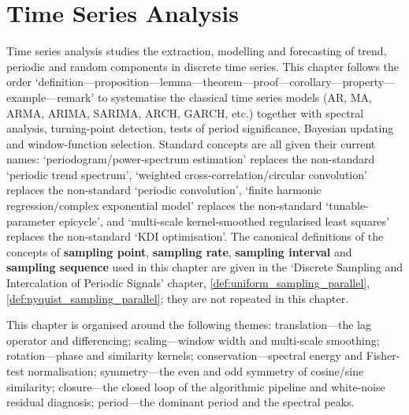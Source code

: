 \chapter{Time Series Analysis}
\label{chap:ts_analysis}

\begin{remark}\label{rem:ts_chapter_positioning}
Time series analysis studies the extraction, modelling and forecasting of trend, periodic and random components in discrete time series. This chapter follows the order `definition---proposition---lemma---theorem---proof---corollary---property---example---remark' to systematise the classical time series models (AR, MA, ARMA, ARIMA, SARIMA, ARCH, GARCH, etc.) together with spectral analysis, turning-point detection, tests of period significance, Bayesian updating and window-function selection. Standard concepts are all given their current names: `periodogram/power-spectrum estimation' replaces the non-standard `periodic trend spectrum', `weighted cross-correlation/circular convolution' replaces the non-standard `periodic convolution', `finite harmonic regression/complex exponential model' replaces the non-standard `tunable-parameter epicycle', and `multi-scale kernel-smoothed regularised least squares' replaces the non-standard `KDI optimisation'. The canonical definitions of the concepts of \textbf{sampling point}, \textbf{sampling rate}, \textbf{sampling interval} and \textbf{sampling sequence} used in this chapter are given in the `Discrete Sampling and Intercalation of Periodic Signals' chapter, \cref{def:uniform_sampling_parallel}, \cref{def:nyquist_sampling_parallel}; they are not repeated in this chapter.
\end{remark}

\begin{remark}\label{rem:ts_theme_overview}
This chapter is organised around the following themes: translation---the lag operator and differencing; scaling---window width and multi-scale smoothing; rotation---phase and similarity kernels; conservation---spectral energy and Fisher-test normalisation; symmetry---the even and odd symmetry of cosine/sine similarity; closure---the closed loop of the algorithmic pipeline and white-noise residual diagnosis; period---the dominant period and the spectral peaks.
\end{remark}

